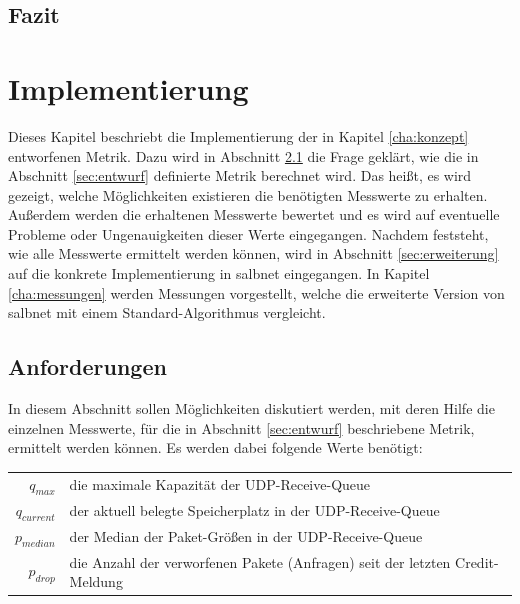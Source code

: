 \documentclass[a4paper, 12pt, BCOR10mm, DIV12, toc=bibliography, toc=listof, german]{scrbook}
\begin{document}

		\section{Fazit} %
		\label{sec:konzept-fazit}
		


	\chapter{Implementierung} %
	\label{cha:implementierung}


	Dieses Kapitel beschriebt die Implementierung der in Kapitel \ref{cha:konzept} entworfenen Metrik.
	Dazu wird in Abschnitt \ref{sec:anforderungen} die Frage geklärt, wie die in Abschnitt
	\ref{sec:entwurf} definierte Metrik berechnet wird. Das heißt, es wird gezeigt, welche
	Möglichkeiten existieren die benötigten Messwerte zu erhalten. Außerdem werden die erhaltenen
	Messwerte bewertet und es wird auf eventuelle Probleme oder Ungenauigkeiten dieser Werte
	eingegangen. Nachdem feststeht, wie alle Messwerte ermittelt werden können, wird in Abschnitt
	\ref{sec:erweiterung} auf die konkrete Implementierung in salbnet eingegangen. In Kapitel
	\ref{cha:messungen} werden Messungen vorgestellt, welche die erweiterte Version von salbnet mit
	einem Standard-Algorithmus vergleicht.
		
		\section{Anforderungen} %
		\label{sec:anforderungen}

		In diesem Abschnitt sollen Möglichkeiten diskutiert werden, mit deren Hilfe die einzelnen
		Messwerte, für die in Abschnitt \ref{sec:entwurf} beschriebene Metrik, ermittelt werden können. Es
		werden dabei folgende Werte benötigt: $~$\\
		
		\begin{tabular}{rl}
			$q_{max}$		  & die maximale Kapazität der UDP-Receive-Queue\\
			$q_{current}$ &	der aktuell belegte Speicherplatz in der UDP-Receive-Queue\\
			$p_{median}$  &	der Median der Paket-Größen in der UDP-Receive-Queue\\
			$p_{drop}$    &	die Anzahl der verworfenen Pakete (Anfragen) seit der letzten Credit-Meldung\\
		\end{tabular}
\end{document}
